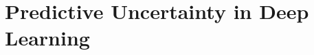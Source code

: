 %
%
%
%
%
%
%


\chapter{Predictive Uncertainty in Deep Learning}
\label{chapter:deepuncertainty}


